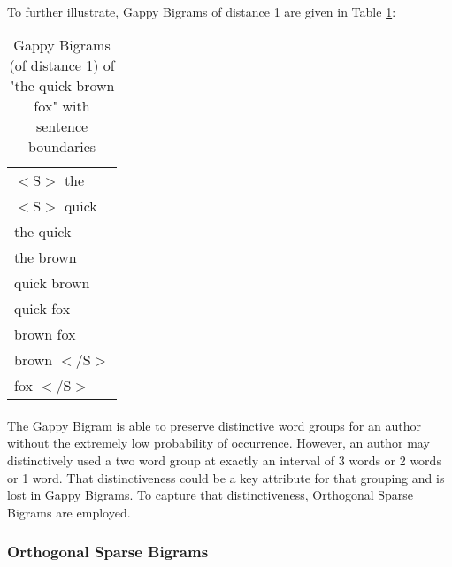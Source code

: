 		\paragraph{}To further illustrate, Gappy Bigrams of distance 1 are given in Table \ref{table:1gappybigrams}:
		
		\begin{center}
			\begin{table}[h]
			\caption{Gappy Bigrams (of distance 1) of "the quick brown fox" with sentence boundaries}
			\label{table:1gappybigrams}
				\begin{center}
					\begin{tabular}{l}
					$<\text{S}>$ the\\
					$<\text{S}>$ quick\\
					the quick\\
					the brown\\
					quick brown\\
					quick fox\\
					brown fox\\
					brown $<\text{/S}>$\\
					fox $<\text{/S}>$\\
					\end{tabular}
				\end{center}
			\end{table}
		\end{center}

		\paragraph{}  The Gappy Bigram is able to preserve distinctive word groups for an author without the extremely low probability of occurrence.  However, an author may distinctively used a two word group at exactly an interval of 3 words or 2 words or 1 word.  That distinctiveness could be a key attribute for that grouping and is lost in Gappy Bigrams.  To capture that distinctiveness, Orthogonal Sparse Bigrams are employed.

	\subsubsection{Orthogonal Sparse Bigrams}
